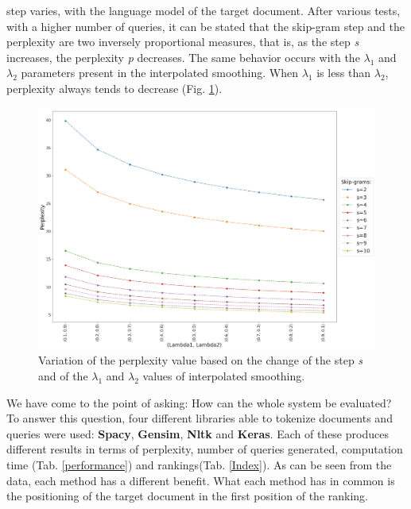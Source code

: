 step varies, with the language model of the target document. After various 
tests, with a higher number of queries, it can be stated that the skip-gram 
step and the perplexity are two inversely proportional measures, that is, as 
the step \emph{s} increases, the perplexity \emph{p} decreases. The same behavior occurs 
with the $\lambda_1$ and $\lambda_2$ parameters present in the interpolated smoothing. When  
$\lambda_1$ is less than  $\lambda_2$, perplexity always tends to decrease (Fig. \ref{perplexity}). 
\begin{figure}[h!]
    \centering
    \includegraphics[width =0.7\linewidth]{images/perplexity.png}
    \centering
    \caption{Variation of the perplexity value based on the change of the step \emph{s} and of the $\lambda_1$ and $\lambda_2$ values of interpolated smoothing.}
    \label{perplexity}
\end{figure}
We have come 
to the point of asking: How can the whole system be evaluated? To answer 
this question, four different libraries able to tokenize documents and queries 
were used: {\bfseries{Spacy}}, {\bfseries{Gensim}}, {\bfseries{Nltk}} and {\bfseries{Keras}}. Each of these produces different 
results in terms of perplexity, number of queries generated, computation time
(Tab. \ref{performance}) and rankings(Tab. \ref{Index}). As can be seen from the data, each method has a different 
benefit. What each method has in common is the positioning of the target 
document in the first position of the ranking.
